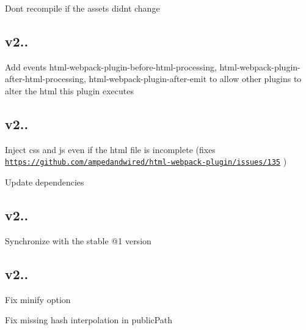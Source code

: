 \begin{DoxyItemize}
\item Don\textquotesingle{}t recompile if the assets didn\textquotesingle{}t change
\end{DoxyItemize}

\subsection*{v2.. }


\begin{DoxyItemize}
\item Add events {\ttfamily html-\/webpack-\/plugin-\/before-\/html-\/processing}, {\ttfamily html-\/webpack-\/plugin-\/after-\/html-\/processing}, {\ttfamily html-\/webpack-\/plugin-\/after-\/emit} to allow other plugins to alter the html this plugin executes
\end{DoxyItemize}

\subsection*{v2.. }


\begin{DoxyItemize}
\item Inject css and js even if the html file is incomplete (fixes \href{https://github.com/ampedandwired/html-webpack-plugin/issues/135}{\tt https\+://github.\+com/ampedandwired/html-\/webpack-\/plugin/issues/135} )
\item Update dependencies
\end{DoxyItemize}

\subsection*{v2.. }


\begin{DoxyItemize}
\item Synchronize with the stable {\ttfamily @1} version
\end{DoxyItemize}

\subsection*{v2.. }


\begin{DoxyItemize}
\item Fix {\ttfamily minify} option
\item Fix missing hash interpolation in public\+Path
\end{DoxyItemize}

